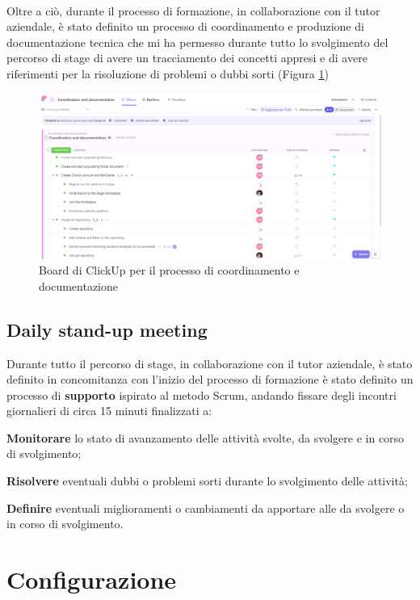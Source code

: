 \\
Oltre a ciò, durante il processo di formazione, in collaborazione con il tutor aziendale, è stato definito un processo di coordinamento e produzione di 
documentazione tecnica che mi ha permesso durante tutto lo svolgimento del percorso di stage di avere un tracciamento dei concetti appresi 
e di avere riferimenti per la risoluzione di problemi o dubbi sorti (Figura \ref{cap:Documentazione})
\begin{figure}[h]
    \centering
    \includegraphics[width=1\textwidth]{images/percorso/coordinamento.png}
    \caption{Board di ClickUp per il processo di coordinamento e documentazione}
    \label{cap:Documentazione}
\end{figure}
\subsection{Daily stand-up meeting}
Durante tutto il percorso di stage, in collaborazione con il tutor aziendale, è stato definito in concomitanza con l'inizio del processo di formazione
è stato definito un processo di \textbf{supporto} ispirato al metodo \gls{Scrum}{}, andando fissare degli incontri giornalieri di circa 15 minuti finalizzati a:
\begin{list}{*}
    \item \textbf{Monitorare} lo stato di avanzamento delle attività svolte, da svolgere e in corso di svolgimento;
    \item \item \textbf{Risolvere} eventuali dubbi o problemi sorti durante lo svolgimento delle attività;
    \item \textbf{Definire} eventuali miglioramenti o cambiamenti da apportare alle da svolgere o in corso di svolgimento.
\end{list}
\section{Configurazione}
